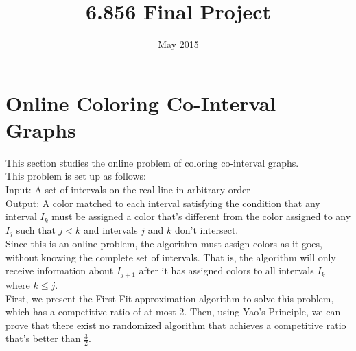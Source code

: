\documentclass{article}
\title{6.856 Final Project}
\author{ }
\date{May 2015}
\begin{document}
\maketitle

\section{Online Coloring Co-Interval Graphs}
This section studies the online problem of coloring co-interval graphs. \\This problem is set up as follows:
\\Input: A set of intervals on the real line in arbitrary order
\\Output: A color matched to each interval satisfying the condition that any interval $I_k$ must be assigned a color that's different from the color assigned to any $I_j$ such that $j < k$ and intervals $j$ and $k$ don't intersect.
\\Since this is an online problem, the algorithm must assign colors as it goes, without knowing the complete set of intervals. That is, the algorithm will only receive information about $I_{j+1}$ after it has assigned colors to all intervals $I_k$ where $k \leq j$.
\\First, we present the First-Fit approximation algorithm to solve this problem, which has a competitive ratio of at most 2. Then, using Yao's Principle, we can prove that there exist no randomized algorithm that achieves a competitive ratio that's better than $\frac{3}{2}$.
\end{document}
